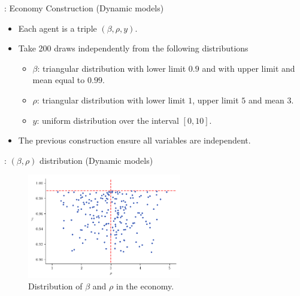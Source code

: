 \documentclass[10pt, handout]{beamer}
\begin{document}
\begin{frame}[label=Carroll-Construction, plain, noframenumbering]{\secname: Economy Construction (Dynamic models) \hyperlink{Carroll-Example}{\beamerreturnbutton}}
	\vfill
	\begin{itemize}
		\item Each agent is a triple $(\beta,\rho,y)$. \vfill
		
		\item Take 200 draws independently from the following distributions\vspace{1ex}
				\begin{itemize}
					\item $\beta$: triangular distribution with lower limit $0.9$ and with upper limit and mean equal to $0.99$. \vspace{2ex}
					\item $\rho$: triangular distribution with lower limit $1$, upper limit $5$ and mean $3$. \vspace{2ex}
					\item $y$: uniform distribution over the interval $[0,10]$. 
				\end{itemize} \vfill
							
		\item The previous construction ensure all variables are independent.
	\end{itemize}

\end{frame}

\begin{frame}[label=Carroll-JointBetaRho, plain, noframenumbering]{\secname: $(\beta, \rho)$ distribution (Dynamic models) \hyperlink{Carroll-Example}{\beamerreturnbutton}}
	\begin{figure}[H]
		\caption{Distribution of $\beta$ and $\rho$ in the economy.}
		\label{fig:distribBetaRho}
		\includegraphics[width=0.6\textwidth]{CarrollDistrib}
	\end{figure}
\end{frame}
\end{document}
